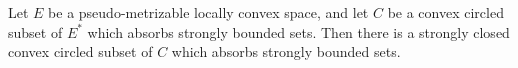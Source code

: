 Let $E$ be a pseudo-metrizable locally convex space, and let $C$ be a convex circled subset of $E^*$ which absorbs strongly bounded sets. Then there is a strongly closed convex circled subset of $C$ which absorbs strongly bounded sets.
